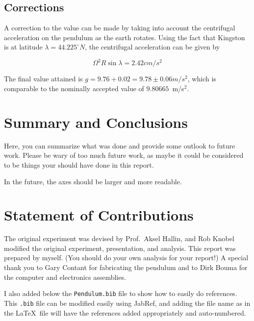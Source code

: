 \documentclass[prb,preprint,groupaddress,showpacs,superbib,floats]{revtex4-1}
\begin{document}
\subsection{Corrections}

A correction to the value can be made by taking into account the centrifugal acceleration on the pendulum as the earth rotates. Using the fact that Kingston is at latitude $\lambda = 44.225^\circ N$, the centrifugal acceleration can be given by

\begin{equation}
\Omega^2 R \sin \lambda = 2.42 cm/s^2
\end{equation}

The final value attained is $g = 9.76 + 0.02 = 9.78 \pm 0.06 m/s^2$, which is comparable to the nominally accepted value of $9.80665$~m/s$^2$.\cite{Taylor08}



\section{Summary and Conclusions}

Here, you can summarize what was done and provide some outlook to future work.  Please be wary of too much future work, as maybe it could be considered to be things your should have done in this report.

In the future, the axes should be larger and more readable.

\section{Statement of Contributions}

The original experiment was devised by Prof.~Aksel Hallin, and Rob Knobel modified the original experiment, presentation, and analysis.  This report was prepared by myself.\cite{Stotz15} (You should do your own analysis for your report!)  A special thank you to Gary Contant for fabricating the pendulum and to Dirk Bouma for the computer and electronics assemblies.

I also added below the \texttt{Pendulum.bib} file to show how to easily do references.  This \texttt{.bib} file can be modified easily using JabRef, and adding the file name as in the \LaTeX \ file will have the references added appropriately and auto-numbered.



\end{document}
